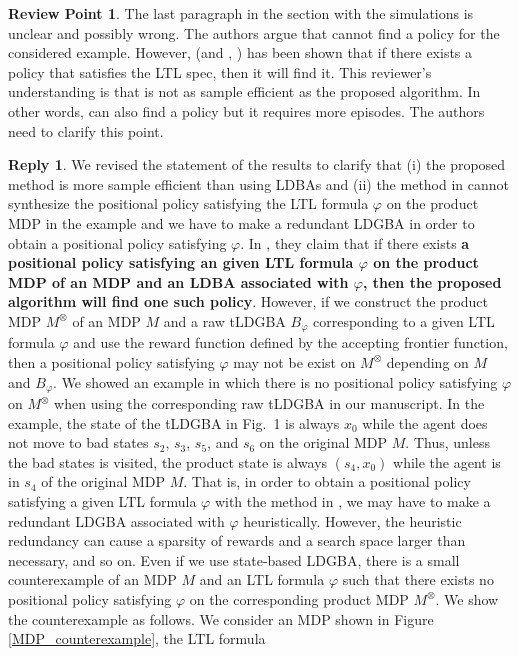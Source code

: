 \documentclass[10 pt, dvipdfmx]{article}
\theoremstyle{definition}
\newtheorem{review point}{Review Point}[section]
\newtheorem*{reply}{Reply}
\begin{document}
\begin{review point}
  The last paragraph in the section with the simulations is unclear
and possibly wrong. The authors argue that \cite{HAK2019} cannot find a policy
for the considered example. However, \cite{HAK2019} (and \cite{HKAKPL2019}, \cite{BWZP2019}) has been
shown that if there exists a policy that satisfies the LTL spec, then
it will find it. This reviewer's understanding is that \cite{HAK2019} is not as
sample efficient as the proposed algorithm. In other words, \cite{HAK2019} can
also find a policy but it requires more episodes. The authors need to
clarify this point.
\end{review point}

\begin{reply}
  We revised the statement of the results to clarify that (i) the proposed method is more sample efficient than using LDBAs and (ii) the method in \cite{HAK2019} cannot synthesize the positional policy satisfying the LTL formula $\varphi$ on the product MDP in the example and we have to make a redundant LDGBA in order to obtain a positional policy satisfying $\varphi$. In \cite{HAK2019}, they claim that if there exists {\bf a positional policy satisfying an given LTL formula $\varphi$ on the product MDP of an MDP and an LDBA associated with $\varphi$, then the proposed algorithm will find one such policy}. However, if we construct the product MDP $M^{\otimes}$ of an MDP $M$ and a raw tLDGBA $B_{\varphi}$ corresponding to a given LTL formula $\varphi$ and use the reward function defined by the accepting frontier function, then a positional policy satisfying $\varphi$ may not be exist on $M^{\otimes}$ depending on $M$ and $B_{\varphi}$. We showed an example in which there is no positional policy satisfying $\varphi$ on $M^{\otimes}$ when using the corresponding raw tLDGBA in our manuscript. In the example, the state of the tLDGBA in Fig.\ 1 is always $x_0$ while the agent does not move to bad states $s_2$, $s_3$, $s_5$, and $s_6$ on the original MDP $M$. Thus, unless the bad states is visited, the product state is always $(s_4, x_0)$ while the agent is in $s_4$ of the original MDP $M$. That is, in order to obtain a positional policy satisfying a given LTL formula $\varphi$ with the method in \cite{HAK2019,HKAKPL2019}, we may have to make a redundant LDGBA associated with $\varphi$ heuristically. However, the heuristic redundancy can cause a sparsity of rewards and a search space larger than necessary, and so on.
  Even if we use state-based LDGBA, there is a small counterexample of an MDP $M$ and an LTL formula $\varphi$ such that there exists no positional policy satisfying $\varphi$ on the corresponding product MDP $M^{\otimes}$. We show the counterexample as follows. We consider an MDP shown in Figure \ref{MDP_counterexample}, the LTL formula

\end{reply}
\end{document}
